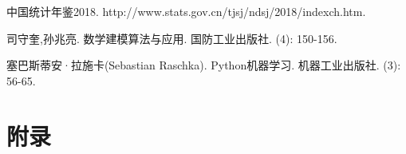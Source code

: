 \documentclass[openany,oneside]{ctexbook}
\begin{document}
\begin{thebibliography}{99}

   \newblock 中国统计年鉴2018.
   \newblock  http://www.stats.gov.cn/tjsj/ndsj/2018/indexch.htm.
   
   
   司守奎,孙兆亮.
   \newblock 数学建模算法与应用.
   \newblock 国防工业出版社.
   (4): 150-156.
   
   塞巴斯蒂安·拉施卡(Sebastian Raschka).
   \newblock Python机器学习.
   \newblock 机器工业出版社.
   (3): 56-65.
   
   
   
   
   
   
   
   \end{thebibliography}


\chapter{附录}\label{note}
\end{document}
